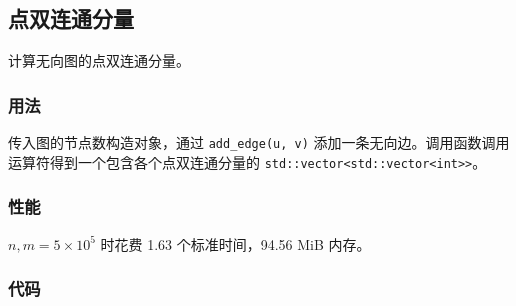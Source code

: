\subsection{点双连通分量}

计算无向图的点双连通分量。

\subsubsection{用法}

传入图的节点数构造对象，通过 \lstinline{add_edge(u, v)} 添加一条无向边。调用函数调用运算符得到一个包含各个点双连通分量的 \lstinline{std::vector<std::vector<int>>}。

\subsubsection{性能}

$n, m = 5 \times 10^5$ 时花费 1.63 个标准时间，94.56 MiB 内存。

\subsubsection{代码}


